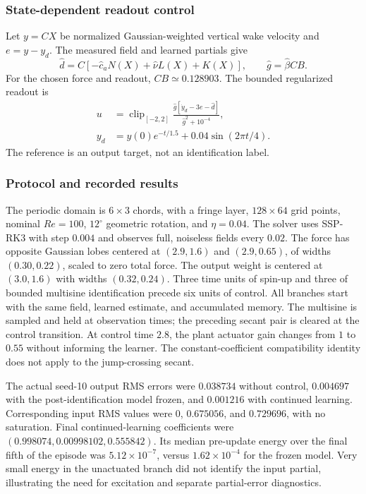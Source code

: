 \documentclass[journal]{IEEEtran}
\begin{document}
\subsubsection{State-dependent readout control}
Let $y=CX$ be normalized Gaussian-weighted vertical wake velocity and
$e=y-y_d$. The measured field and learned partials give
\begin{equation}
 \hat d=C[-\hat c_aN(X)+\hat\nu L(X)+K(X)],
 \qquad \hat g=\hat\beta CB.
\end{equation}
For the chosen force and readout, $CB\simeq0.128903$. The bounded regularized
readout is
\begin{align}
 u&=\operatorname{clip}_{[-2,2]}
 \frac{\hat g[\dot y_d-3e-\hat d]}{\hat g^2+10^{-4}},
 \label{eq:afc_short_control}
 \\
 y_d&=y(0)e^{-t/1.5}+0.04\sin(2\pi t/4).\nonumber
\end{align}
The reference is an output target, not an identification label.

\subsubsection{Protocol and recorded results}
The periodic domain is $6\times3$ chords, with a fringe layer, $128\times64$
grid points, nominal $Re=100$, $12^\circ$ geometric rotation, and
$\eta=0.04$. The solver uses SSP-RK3 with step $0.004$ and observes full,
noiseless fields every $0.02$. The force has opposite Gaussian lobes centered
at $(2.9,1.6)$ and $(2.9,0.65)$, of widths $(0.30,0.22)$, scaled to zero
total force. The output weight is centered at $(3.0,1.6)$ with widths
$(0.32,0.24)$. Three time units of spin-up and three of bounded multisine
identification precede six units of control. All branches start with the
same field, learned estimate, and accumulated memory. The multisine is
sampled and held at observation times; the preceding secant pair is cleared
at the control transition. At control time $2.8$, the plant actuator
gain changes from $1$ to $0.55$ without informing the learner. The
constant-coefficient compatibility identity does not apply to the
jump-crossing secant.

The actual seed-10 output RMS errors were $0.038734$ without control,
$0.004697$ with the post-identification model frozen, and $0.001216$ with
continued learning. Corresponding input RMS values were $0$, $0.675056$,
and $0.729696$, with no saturation. Final continued-learning coefficients
were $(0.998074,0.00998102,0.555842)$. Its median pre-update energy over the
final fifth of the episode was $5.12\times10^{-7}$, versus
$1.62\times10^{-4}$ for the frozen model. Very small energy in the
unactuated branch did not identify the input partial, illustrating the
need for excitation and separate partial-error diagnostics.
\end{document}
